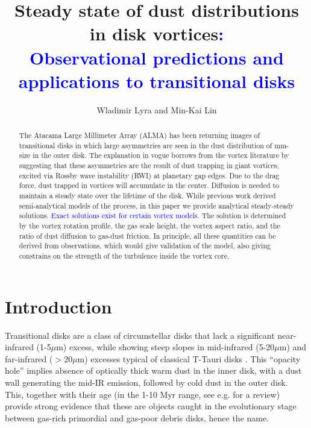 \documentclass[apj]{emulateapj}
\def\blue#1{\textcolor{blue}{#1}}
\begin{document}
\title{Steady state of dust distributions in disk vortices{\blue:}\\
\blue{Observational predictions and applications to transitional disks}}
\author{Wladimir Lyra and Min-Kai Lin}

\begin{abstract}
The Atacama Large Millimeter Array (ALMA) has been  returning images of transitional disks in which large asymmetries are seen in the dust distribution of 
mm-size in the outer disk. The explanation in vogue borrows from the vortex literature by suggesting 
that these asymmetries are the result of dust trapping in giant vortices, excited via Rossby wave instability (RWI) 
at planetary gap edges. Due to the drag force, dust trapped in vortices will accumulate 
in the center. Diffusion is needed to maintain a steady state over the lifetime of the disk. While previous work 
derived semi-analytical models of the process, in this paper we
provide analytical steady-steady solutions. \blue{Exact solutions exist for certain vortex models.}
The solution is determined by the vortex rotation profile, the gas scale height, the 
vortex aspect ratio, and the ratio of dust diffusion to gas-dust friction. In principle, all these quantities can be derived
from observations, which would give validation of the model, also giving constrains on the strength of the turbulence 
inside the vortex core.
\end{abstract}

\section{Introduction}
\label{sect:introduction}

Transitional disks are a class of circumstellar disks that lack a
significant near-infrared (1-5$\mu$m) excess, while showing steep
slopes in mid-infrared (5-20$\mu$m) and
far-infrared ($>$20$\mu$m) excesses typical of classical T-Tauri disks
\citep{Strom89,Skrutskie90,Gauvin-Strom92,Wolk-Walter96,Calvet02,Calvet05,Muzerolle06,Sicilia06,Currie09,Currie-Sicilia11}. 
This ``opacity hole''  implies absence of optically thick warm dust in the inner disk, with a dust
wall generating the mid-IR emission, followed by cold dust in the
outer disk.  This, together with their age (in the 1-10 Myr range, see
e.g. \citealt{Currie10} for a review) provide strong evidence that these are
objects caught in the evolutionary stage between gas-rich 
primordial and gas-poor debris disks, hence the name. 
\end{document}

